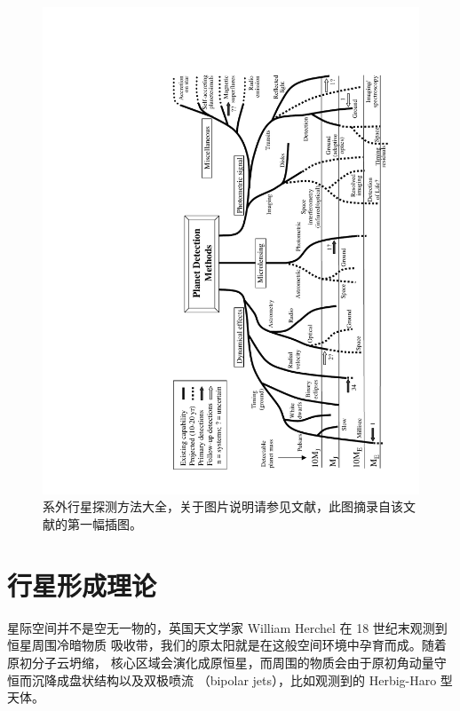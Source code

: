 \begin{figure}
    \centering
    \includegraphics[scale=0.95, angle=-90]{figures/chapter1/fig4_fmethods.pdf}
    \caption[系外行星探测方法大全，图片版权 Michael Perryman。]{系外行星探测方法大全，关于图片说明请参见文献，此图摘录自该文献的第一幅插图。}
    \label{fig:detmethod}
\end{figure}


\section{行星形成理论} \label{sec:pltfrmatntheory}


星际空间并不是空无一物的，英国天文学家 William Herchel 在 18 世纪末观测到恒星周围冷暗物质
吸收带，我们的原太阳就是在这般空间环境中孕育而成\cite{Spitzer1978}。随着原初分子云坍缩，
核心区域会演化成原恒星，而周围的物质会由于原初角动量守恒而沉降成盘状结构以及双极喷流
（bipolar jets），比如观测到的 Herbig-Haro 型天体\cite{Lequeux2005}。

